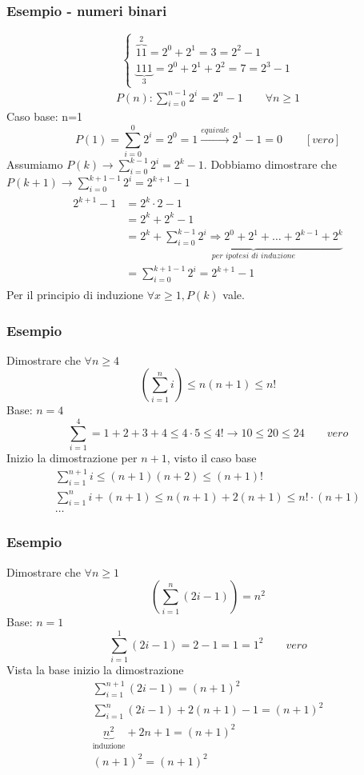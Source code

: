 \documentclass[italian]{article}
\begin{document}
\subsubsection{Esempio - numeri binari}
\[
	\begin{cases*}
		\overbrace{11}^{2} = 2^0 + 2^1 = 3 = 2^2 -1 \\
		\underbrace{111}_{3} = 2^0 + 2^1 + 2^2 = 7 = 2^3 -1
	\end{cases*}
\]
\begin{gather*}
	P(n): \sum_{i=0}^{n-1}2^i = 2^n - 1 \qquad \forall n \geq 1
\end{gather*}
Caso base: n=1
\[
	P(1)=\sum_{i=0}^{0}2^i=2^0=1 \xrightarrow{equivale} 2^1 -1 = 0 \qquad [vero]
\]
Assumiamo $P(k) \to \sum_{i=0}^{k-1}2^i = 2^k -1$. Dobbiamo dimostrare che $P(k+1) \to \sum_{i=0}^{k+1-1}2^i=2^{k+1}-1$
\begin{gather*}
	\begin{split}
		2^{k+1}-1 & = 2^k\cdot 2 - 1 \\
		& = 2^k + 2^k -1 \\
		& = 2^k + \underbrace{\sum_{i=0}^{k-1}2^i \Rightarrow 2^0 + 2^1 + \dots + 2^{k-1} + 2^k}_{\textit{per ipotesi di induzione}} \\
		& = \sum_{i=0}^{k+1-1}2^i=2^{k+1}-1
	\end{split}
\end{gather*}
Per il principio di induzione $\forall x \geq 1, P(k) $ vale. 

\pagebreak
\subsubsection{Esempio}
Dimostrare che $\forall n \geq 4$
\[
	\left(	\sum_{i=1}^{n}i \right) \leq n(n+1) \leq n!
\]
Base: $n=4$
\[
	\sum_{i=1}^{4} = 1 + 2 + 3 + 4 \leq 4\cdot 5 \leq 4! \to 10\leq20\leq 24 \qquad vero
\]
Inizio la dimostrazione per $n+1$, visto il caso base
\begin{gather*}
	\sum_{i=1}^{n+1}i \leq (n+1)(n+2) \leq (n+1)! \\
	\sum_{i=1}^{n}i + (n+1) \leq n(n+1)+2(n+1) \leq n!\cdot(n+1) \\
	\dots
\end{gather*}

\subsubsection{Esempio}
Dimostrare che $\forall n \geq 1$
\[
	\left(	\sum_{i=1}^{n}(2i - 1)\right) = n^2
\]
Base: $n=1$
\[
	\sum_{i=1}^{1}(2i-1) = 2 - 1 = 1 = 1^2 \qquad vero
\]
Vista la base inizio la dimostrazione
\begin{gather*}
	\sum_{i=1}^{n+1}(2i - 1) = (n+1)^2 \\
	\sum_{i=1}^{n}(2i - 1) + 2(n+1)-1 = (n+1)^2 \\
	\underbrace{n^2}_{\text{induzione}} + 2n + 1 = (n+1)^2 \\
	(n+1)^2 = (n+1)^2
\end{gather*}
\pagebreak
\end{document}
